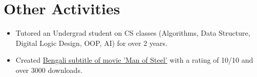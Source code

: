 \documentclass[a4paper,10pt]{article}
\begin{document}
\section{Other Activities}
\begin{itemize}
    \item Tutored an Undergrad student on CS classes (Algorithms, Data Structure, Digital Logic Design, OOP, AI) for over 2 years.
    
    \item Created \href{https://subscene.com/subtitles/man-of-steel/bengali/805207}{Bengali subtitle of movie 'Man of Steel'} with a rating of 10/10 and over 3000 downloads.
\end{itemize}


\begin{comment}
\section{Research Experience}
\begin{itemize}
    \item \textbf{\textsc{Topic-Relevant Fragment Extraction From Video Tutorials}} \\
    Supervisor : Dr. Anindya Iqbal, Bangladesh University of Engineering and Technology \\
    Focus : Software Engineering, Information retrieval \\
    Summary : The target was to identify the interval when a certain topic was discussed in a very lengthy video. OCR, Speech-to-text were used to identify those intervals. To increase the efficiency of OCR 'Weighted Levenshtein distance' was used. The application was successfully tested with 985 min long \textsc{Youtube} videos.
\end{itemize}

\end{comment}
\end{document}
